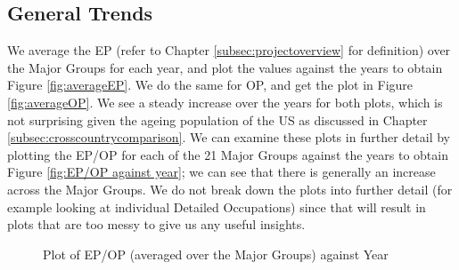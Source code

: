 \documentclass[11pt]{article}
\begin{document}
\subsection{General Trends}
\label{subsec:generaltrends}
We average the EP (refer to Chapter \ref{subsec:projectoverview} for definition) over the Major Groups for each year, and plot the values against the years to obtain Figure \ref{fig:averageEP}. We do the same for OP, and get the plot in Figure \ref{fig:averageOP}. We see a steady increase over the years for both plots, which is not surprising given the ageing population of the US as discussed in Chapter \ref{subsec:crosscountrycomparison}. We can examine these plots in further detail by plotting the EP/OP for each of the 21 Major Groups against the years to obtain Figure \ref{fig:EP/OP against year}; we can see that there is generally an increase across the Major Groups. We do not break down the plots into further detail (for example looking at individual Detailed Occupations) since that will result in plots that are too messy to give us any useful insights.



\begin{figure}[!htb]
	\centering
	\hfill
	\hfill
	\caption{Plot of EP/OP (averaged over the Major Groups) against Year}
\end{figure}
\end{document}
